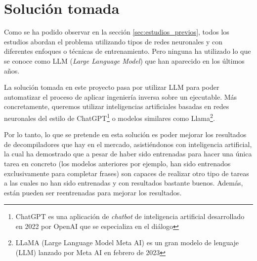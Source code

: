 \section{Solución tomada}
\label{sec:solucion}


Como se ha podido observar en la sección \ref{sec:estudios_previos}, todos los estudios abordan
el problema utilizando tipos de redes neuronales y con diferentes enfoques o técnicas de entrenamiento.
Pero ninguna ha utilizado lo que se conoce como LLM (\textit{Large Language Model}) que han aparecido
en los últimos años.

La solución tomada en este proyecto pasa por utilizar LLM para poder automatizar el proceso de
aplicar ingeniería inversa sobre un ejecutable. Más concretamente, queremos utilizar inteligencias
artificiales basadas en redes neuronales del estilo de ChatGPT\footnote{ChatGPT es una aplicación de
\textit{chatbot} de inteligencia artificial desarrollado en 2022 por OpenAI que se especializa en el
diálogo} o modelos similares como Llama\footnote{LLaMA (Large Language Model Meta AI) es un gran
modelo de lenguaje (LLM) lanzado por Meta AI en febrero de 2023}.

Por lo tanto, lo que se pretende en esta solución es poder mejorar los resultados de decompiladores
que hay en el mercado, asistiéndonos con inteligencia artificial, la cual ha demostrado
que a pesar de haber sido entrenadas para hacer una única tarea en concreto (los modelos anteriores
por ejemplo, han sido entrenados exclusivamente para completar frases) son capaces de
realizar otro tipo de tareas a las cuales no han sido entrenadas y con resultados bastante buenos.
Además, están pueden ser reentrenadas para mejorar los resultados.
